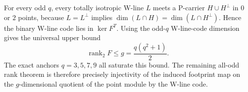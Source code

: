 For every odd $q$, every totally isotropic W-line $L$ meets a P-carrier
$H\cup H^\perp$ in $0$ or $2$ points, because $L=L^\perp$ implies
$\dim(L\cap H)=\dim(L\cap H^\perp)$.  Hence the binary W-line code lies in
$\ker F^T$.  Using the odd-$q$ W-line-code dimension gives the universal upper
bound
\[
  \operatorname{rank}_2F\le g=\frac{q(q^2+1)}2.
\]
The exact anchors $q=3,5,7,9$ all saturate this bound.  The remaining all-odd
rank theorem is therefore precisely injectivity of the induced footprint map on
the $g$-dimensional quotient of the point module by the W-line code.
